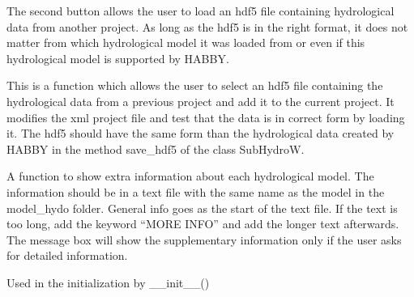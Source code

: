 \documentclass[letterpaper,10pt,english]{sphinxmanual}
\begin{document}
\begin{fulllineitems}
\begin{itemize}
\end{itemize}

The second button allows the user to load an hdf5 file containing hydrological data from another project.
As long as the hdf5 is in the right format, it does not matter from which hydrological model it was loaded from
or even if this hydrological model is supported by HABBY.

\begin{fulllineitems}
\label{\detokenize{index:src_GUI.hydro_GUI_2.Hydro2W.get_new_hydro_hdf5}}
This is a function which allows the user to select an hdf5 file containing the hydrological
data from a previous project and add it to the current project. It modifies the xml project file and test
that the data is in correct form by loading it. The hdf5 should have the same form than the hydrological data
created by HABBY in the method save\_hdf5 of the class SubHydroW.

\end{fulllineitems}


\begin{fulllineitems}
\label{\detokenize{index:src_GUI.hydro_GUI_2.Hydro2W.give_info_model}}
A function to show extra information about each hydrological model.
The information should be in a text file with the same name as the model in the model\_hydo folder.
General info goes as the start of the text file. If the text is too long, add the keyword ``MORE INFO''
and add the longer text afterwards. The message box will show the supplementary information only if the user
asks for detailed information.

\end{fulllineitems}


\begin{fulllineitems}
\label{\detokenize{index:src_GUI.hydro_GUI_2.Hydro2W.init_iu}}
Used in the initialization by \_\_init\_\_()

\end{fulllineitems}



\end{fulllineitems}
\end{document}
